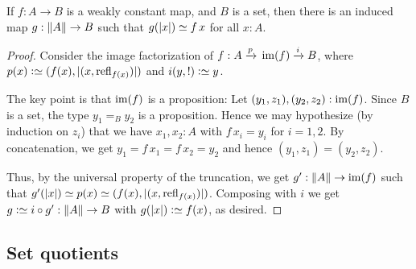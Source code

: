\begin{theorem}\label{thm:wconstant-elim}
  If $f : A \to B$ is a weakly constant map, and $B$ is a set, then
  there is an induced map $g : \lVert A\rVert \to B$ such that
  $g(\trunc x)\jdeq f\,x$ for all $x:A$.
\end{theorem}
\begin{proof}
  Consider the image factorization of $f : A \xrightarrow{p}{} \im(f)
  \xrightarrow{i}{} B$,
  where $p(x) \defeq (f(x),\trunc{(x,\refl{f(x)})})$
  and $i(y,!) \defeq y$.

  The key point is that $\im(f)$ is a proposition: Let
  $(y_1,z_1),(y_2,z_2):\im(f)$. Since $B$ is a set, the type $y_1=_B
  y_2$ is a proposition. Hence we may hypothesize (by induction on $z_i$)
  that we have $x_1,x_2:A$ with
  $f\,x_i = y_i$ for $i=1,2$. By concatenation, we get
  $y_1=f\,x_1=f\,x_2=y_2$ and hence $(y_1,z_1)=(y_2,z_2)$.

  Thus, by the universal property of the truncation,
  we get $g' : \Trunc A \to \im(f)$ such
  that $g'(\trunc x) \jdeq p(x) \jdeq (f(x),\trunc{(x,\refl{f(x)})})$.
  Composing with $i$ we get $g\defeq i\circ g' : \Trunc A \to B$
  with $g(\trunc x) \defeq f(x)$, as desired.
\end{proof}

\subsection{Set quotients}

